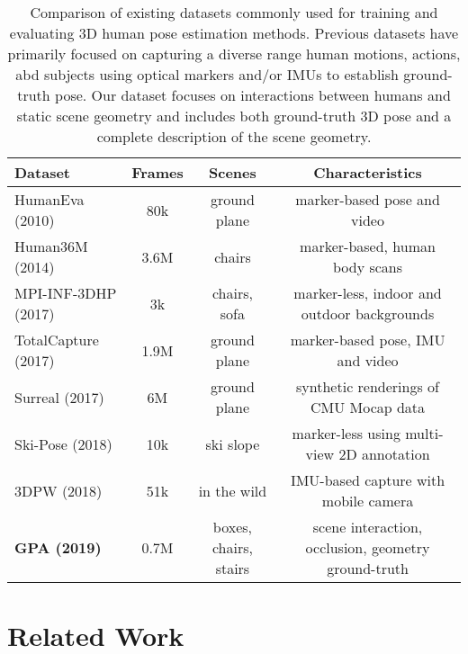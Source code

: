 \documentclass[times,referee,twocolumn,final,authoryear]{elsarticle}
\begin{document}
\begin{table*}[!ht]
\small
\begin{center}
\begin{tabular}{|l|c|c|c|}
\hline
Dataset & Frames & Scenes & Characteristics \\
\hline
HumanEva (2010)  & 80k & ground plane & marker-based pose and video \\
Human36M (2014) & 3.6M & chairs & marker-based, human body scans \\
MPI-INF-3DHP (2017) & 3k & chairs, sofa & marker-less, indoor and outdoor backgrounds\\
TotalCapture (2017) & 1.9M & ground plane  & marker-based pose, IMU and video \\
Surreal (2017) & 6M & ground plane  & synthetic renderings of CMU Mocap data \\
Ski-Pose (2018) & 10k & ski slope  & marker-less using multi-view 2D annotation\\
3DPW (2018) & 51k & in the wild  & IMU-based capture with mobile camera\\
\textbf{GPA (2019)} & 0.7M & boxes, chairs, stairs  & scene interaction, occlusion, geometry ground-truth\\
\hline
\end{tabular}
\end{center}
\caption{Comparison of existing datasets commonly used for training and evaluating 3D human pose estimation methods. Previous datasets have primarily focused on capturing a diverse range human motions, actions, abd subjects using optical markers and/or IMUs to establish ground-truth pose. Our dataset focuses on interactions between humans and static scene geometry and includes both ground-truth 3D pose and a complete description of the scene geometry.}
\label{table:datasets}
\end{table*}



\section{Related Work}
\end{document}

